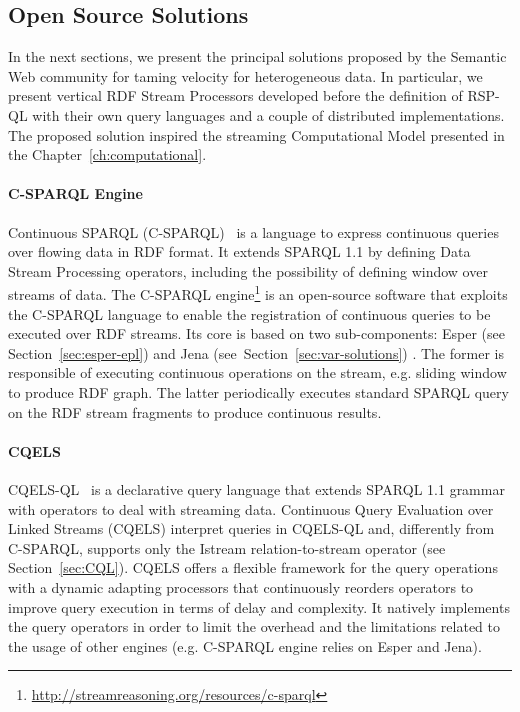 \subsection{Open Source Solutions} \label{sec:vel-var-solutions}
In the next sections, we present the principal solutions proposed by the Semantic Web community for taming velocity for heterogeneous data. 
In particular, we present vertical RDF Stream Processors developed before the definition of RSP-QL with their own query languages and a couple of distributed implementations. The proposed solution inspired the streaming Computational Model presented in the Chapter~\ref{ch:computational}.

\paragraph{C-SPARQL Engine}
Continuous SPARQL (C-SPARQL)~\cite{DBLP:journals/ijsc/BarbieriBCVG10} is a language to express continuous queries over flowing data in RDF format. It extends SPARQL 1.1 by defining Data Stream Processing operators, including the possibility of defining window over streams of data.
The C-SPARQL engine\footnote{\url{http://streamreasoning.org/resources/c-sparql}} is an open-source software that exploits the C-SPARQL language to enable the registration of continuous queries to be executed over RDF streams.
Its core is based on two sub-components: Esper (see Section~\ref{sec:esper-epl}) and Jena (see~Section~\ref{sec:var-solutions}) . The former is responsible of executing continuous 
operations on the stream, e.g. sliding window to produce RDF graph. The latter periodically executes standard SPARQL query on the RDF stream fragments to produce continuous results.

\paragraph{CQELS}
CQELS-QL~\cite{DBLP:conf/semweb/PhuocDPH11} is a declarative query language that extends SPARQL 1.1 grammar with operators to deal with streaming data. Continuous Query Evaluation over Linked Streams (CQELS) interpret queries in CQELS-QL and, differently from C-SPARQL, supports only the Istream relation-to-stream operator (see Section~\ref{sec:CQL}).
CQELS offers a flexible framework for the query operations with a dynamic adapting processors that continuously reorders operators to improve query execution in terms of delay and complexity.
It natively implements the query operators in order to limit the overhead and the limitations related to the usage of other engines (e.g. C-SPARQL engine relies on Esper and Jena).

